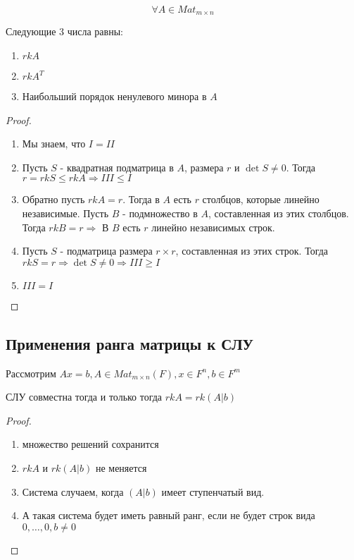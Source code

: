 \begin{theorem}
    
    $$\forall A \in Mat_{m \times n}$$

    Следующие 3 числа равны:

    \begin{enumerate}
        \item $rk A$
        \item $rk A^T$
        \item Наибольший порядок ненулевого минора в $A$
    \end{enumerate}

    \begin{proof}~
        \begin{enumerate}
            \item Мы знаем, что $I = II$
            \item Пусть $S$ - квадратная подматрица в $A$, размера $r$ и $\det S \not= 0$. Тогда $r = rk S \leq rk A \Rightarrow III \leq I$
            \item Обратно пусть $rk A = r$. Тогда в $A$ есть $r$ столбцов, которые линейно независимые. Пусть $B$ - подмножество в $A$, составленная из этих столбцов. Тогда $rk B = r \Rightarrow $ В $B$ есть $r$ линейно независимых строк.
            \item Пусть $S$ - подматрица размера $r \times r$, составленная из этих строк. Тогда $rk S = r \Rightarrow \det S \not= 0 \Rightarrow III \geq I$
            \item $III = I$
        \end{enumerate}
    \end{proof}

\end{theorem}


\subsection{Применения ранга матрицы к СЛУ}


Рассмотрим $Ax = b, A \in Mat_{m \times n}(F), x \in F^n, b \in F^m$


\begin{theorem}
    
    СЛУ совместна тогда и только тогда $rk A = rk (A|b)$

    \begin{proof}~
        \begin{enumerate}
            \item множество решений сохранится
            \item $rk A$ и $rk (A|b)$ не меняется
            \item Система  случаем, когда $(A|b)$ имеет ступенчатый вид. 
            \item А такая система будет иметь равный ранг, если не будет строк вида $0, \dots, 0, b \not= 0$
        \end{enumerate}
    \end{proof}

\end{theorem}


